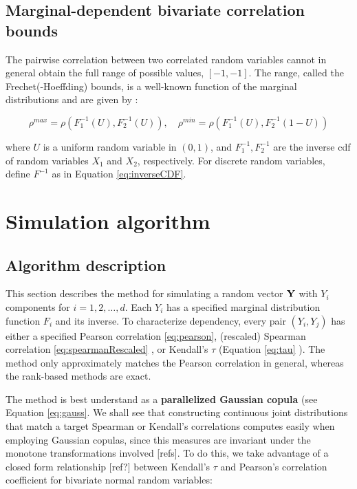 \documentclass[
]{article}
\begin{document}
\hypertarget{marginal-dependent-bivariate-correlation-bounds}{%
\subsection{Marginal-dependent bivariate correlation bounds}\label{marginal-dependent-bivariate-correlation-bounds}}

The pairwise correlation between two correlated random variables cannot in general obtain the full range of possible values, \([-1,-1]\). The range, called the Frechet(-Hoeffding) bounds, is a well-known function of the marginal distributions and are given by \citep{BF17}:

\begin{equation}
\label{eq:frechet}
\rho^{max} = \rho \left( F^{-1}_1 (U), F^{-1}_2 (U) \right), \quad \rho^{min} = \rho \left( F^{-1}_1 (U), F^{-1}_2 (1 - U) \right)
\end{equation}

\noindent where \(U\) is a uniform random variable in \((0,1)\), and \(F^{-1}_1, F^{-1}_2\) are the inverse cdf of random variables \(X_1\) and \(X_2\), respectively. For discrete random variables, define \(F^{-1}\) as in Equation \eqref{eq:inverseCDF}.

\hypertarget{simulation-algorithm}{%
\section{Simulation algorithm}\label{simulation-algorithm}}

\hypertarget{algorithm-description}{%
\subsection{Algorithm description}\label{algorithm-description}}

This section describes the method for simulating a random vector \(\bf Y\) with \(Y_i\) components for \(i=1,2,\ldots,d\). Each \(Y_i\) has a specified marginal
distribution function \(F_i\) and its inverse. To characterize dependency, every pair \((Y_i, Y_j)\) has either a specified Pearson correlation \eqref{eq:pearson}, (rescaled) Spearman correlation \eqref{eq:spearmanRescaled} , or Kendall's \(\tau\) (Equation \eqref{eq:tau} ). The method only approximately matches the Pearson correlation in general, whereas the rank-based methods are exact.

The method is best understand as a \textbf{parallelized Gaussian copula} (see Equation \eqref{eq:gauss}. We shall see that constructing continuous joint distributions that match a target Spearman or Kendall's correlations computes easily when employing Gaussian copulas, since this measures are invariant under the monotone transformations involved {[}refs{]}. To do this, we take advantage of a closed form relationship {[}ref?{]} between Kendall's \(\tau\) and Pearson's correlation coefficient for bivariate normal random variables:
\end{document}

